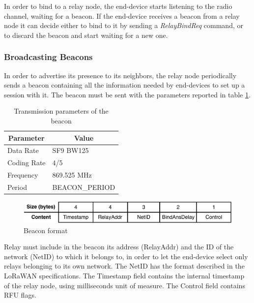In order to bind to a relay node, the end-device starts listening to the radio channel, waiting for a beacon. If the end-device receives a beacon from a relay node it can decide either to bind to it by sending a \emph{RelayBindReq} command, or to discard the beacon and start waiting for a new one.


\subsubsection{Broadcasting Beacons}

In order to advertise its presence to its neighbors, the relay node periodically sends a beacon containing all the information needed by end-devices to set up a session with it. The beacon must be sent with the parameters reported in table \ref{tab:beaconparams}.


\begin{table}[]
\centering
\caption{Transmission parameters of the beacon}
\label{tab:beaconparams}
\begin{tabular}{@{}ll@{}}
\toprule
\multicolumn{1}{c}{Parameter} & \multicolumn{1}{c}{Value} \\ \midrule
Data Rate                     & SF9 BW125                 \\
Coding Rate                   & 4/5                       \\
Frequency                     & 869.525 MHz               \\
Period                        & BEACON\_PERIOD            \\ \bottomrule
\end{tabular}
\end{table}



\begin{figure}[!h]
\centering
\includegraphics[width=\textwidth]{img/Beacon}
\caption{Beacon format}
\label{fig:beacon}
\end{figure}


Relay must include in the beacon its address (RelayAddr) and the ID of the network (NetID) to which it belongs to, in order to let the end-device select only relays belonging to its own network. The NetID has the format described in the LoRaWAN specifications. The Timestamp field contains the internal timestamp of the relay node, using milliseconds unit of measure. The Control field contains RFU flags.




